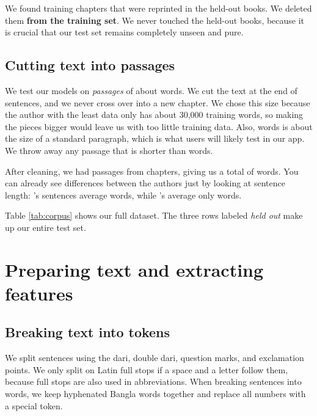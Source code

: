 We found \nOverlapHits{} training chapters that were reprinted in the held-out books. We deleted them \textbf{from the training set}. We never touched the held-out books, because it is crucial that our test set remains completely unseen and pure.

\subsection{Cutting text into passages}

We test our models on \emph{passages} of about \PassageTokens{} words. We cut the text at the end of sentences, and we never cross over into a new chapter. We chose this size because the author with the least data only has about 30,000 training words, so making the pieces bigger would leave us with too little training data. Also, \PassageTokens{} words is about the size of a standard paragraph, which is what users will likely test in our app. We throw away any passage that is shorter than \MinPassageTokens{} words.

After cleaning, we had \nPassages{} passages from \nChapters{} chapters, giving us a total of \nTokens{} words. You can already see differences between the authors just by looking at sentence length: \longestSentAuthor{}'s sentences average \longestSentLen{} words, while \shortestSentAuthor{}'s average only \shortestSentLen{} words.

\begin{table}[H]
\centering\small
\caption{The dataset, book by book. It is unbalanced, with Tagore having much more text than Humayun Ahmed. This is why we use class weights during training instead of deleting text.}
\label{tab:corpus}

\end{table}

Table \ref{tab:corpus} shows our full dataset. The three rows labeled \emph{held out} make up our entire test set.

\section{Preparing text and extracting features}

\subsection{Breaking text into tokens}

We split sentences using the dari, double dari, question marks, and exclamation points. We only split on Latin full stops if a space and a letter follow them, because full stops are also used in abbreviations. When breaking sentences into words, we keep hyphenated Bangla words together and replace all numbers with a special token.

